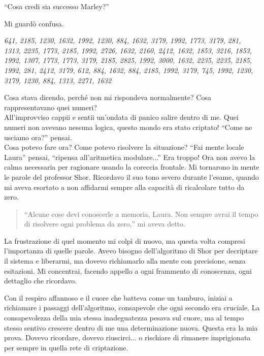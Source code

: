 \begin{dialogue}
 \enquote{Cosa credi sia successo Marley?}
\end{dialogue}

Mi guardò confusa.

\begin{dialogue}
 \begin{tcolorbox}[colback=white!95!blue!5, colframe=blue!75!black, title=\textbf{Messaggio di Marley}, fonttitle=\bfseries]
\emph{
641, 2185, 1230, 1632, 1992, 1230, 884, 1632, 3179, 1992, 1773, 3179, 281, 1313, 2235, 1773, 2185, 1992, 2726, 1632, 2160, 2412, 1632, 1853, 3216, 1853, 1992, 1307, 1773, 1773, 3179, 2185, 2825, 1992, 3000, 1632, 2235, 2235, 2185, 1992, 281, 2412, 3179, 612, 884, 1632, 884, 2185, 1992, 3179, 745, 1992, 1230, 3179, 1230, 884, 1313, 2271, 1632
}
\end{tcolorbox}

\end{dialogue}



Cosa stava dicendo, perché non mi rispondeva normalmente? Cosa rappresentavano quei numeri?\\
All'improvviso cappii e sentii un'ondata di panico salire dentro di me. Quei numeri non avevano nessuna logica, questo mondo era stato criptato! ``Come ne usciamo ora?'' pensai.\\ 
Cosa potevo fare ora? Come potevo risolvere la situazione? ``Fai mente locale Laura'' pensai, ``ripensa all'aritmetica modulare...'' Era troppo! Ora non avevo la calma necessaria per ragionare usando la coreccia frontale. Mi tornarono in mente le parole del professor Shor. Ricordavo il suo tono severo durante l'esame, quando mi aveva esortato a non affidarmi sempre alla capacità di ricalcolare tutto da zero.

\begin{quote}
\enquote{Alcune cose devi conoscerle a memoria, Laura. Non sempre avrai il tempo di risolvere ogni problema da zero,} mi aveva detto.
\end{quote}

La frustrazione di quel momento mi colpì di nuovo, ma questa volta compresi l'importanza di quelle parole. Avevo bisogno dell'algoritmo di Shor per decriptare il sistema e liberarmi, ma dovevo richiamarlo alla mente con precisione, senza esitazioni. Mi concentrai, facendo appello a ogni frammento di conoscenza, ogni dettaglio che ricordavo.

Con il respiro affannoso e il cuore che batteva come un tamburo, iniziai a richiamare i passaggi dell'algoritmo, consapevole che ogni secondo era cruciale. La consapevolezza della mia stessa inadeguatezza pesava sul cuore, ma al tempo stesso sentivo crescere dentro di me una determinazione nuova. Questa era la mia prova. Dovevo ricordare, dovevo riuscirci... o rischiare di rimanere imprigionata per sempre in quella rete di criptazione.

